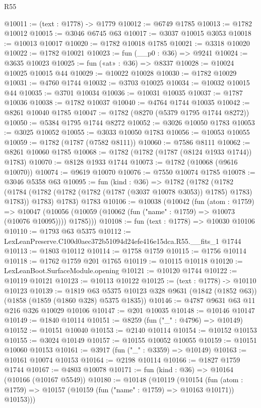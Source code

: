 \begin{lexlean}{R55}
\begin{coremodule}
@10011 := (text : @1778) -> @1779
@10012 := @6749 @1785
@10013 := @1782 @10012
@10015 := @3046 @6745 @63
@10017 := @3037 @10015 @3053
@10018 := @10013 @10017
@10020 := @1782 @10018 @1785
@10021 := @3318 @10020
@10022 := @1782 @10021
@10023 := fun (__p0 : @36) => @9241
@10024 := @3635 @10023
@10025 := fun («at» : @36) => @8337
@10028 := @10024 @10025 @10015 @44
@10029 := @10022 @10028
@10030 := @1782 @10029
@10031 := @4760 @1744
@10032 := @3703 @10025
@10034 := @10032 @10015 @44
@10035 := @3701 @10034
@10036 := @10031 @10035
@10037 := @1787 @10036
@10038 := @1782 @10037
@10040 := @4764 @1744 @10035
@10042 := @8261 @10040 @1785
@10047 := @1782 (@8270 (@5379 @1795 @1744 @8272))
@10050 := @5384 @1795 @1744 @8272
@10052 := @3026 @10050 @1783
@10053 := @3025 @10052
@10055 := @3033 @10050 @1783
@10056 := @10053 @10055
@10059 := @1782 (@1787 (@7582 @8111))
@10060 := @7586 @8111
@10062 := @8261 @10060 @1785
@10068 := @1782 (@1782 (@1787 (@8124 @1933 @1744)) @1783)
@10070 := @8128 @1933 @1744
@10073 := @1782 (@10068 (@9616 @10070))
@10074 := @9619 @10070
@10076 := @7550 @10074 @1785
@10078 := @3046 @5358 @63
@10095 := fun (kind : @36) =>
  @1782
    (@1782
      (@1782 (@1784 (@1782 (@1782 (@1782 (@1787 (@3037 @10078 @3053)) @1785) @1783) @1783)) @1783)
      @1783)
    @1783
@10106 := @10038
    (@10042
      (fun (atom : @1759) =>
      @10047 (@10056 (@10059 (@10062 (fun ("name" : @1759) => @10073 (@10076 @10095)))) @1785)))
@10108 := fun (text : @1778) => @10030 @10106
@10110 := @1793 @63 @5375
@10112 := LexLeanPreserve.C100d0aec372b51094d24efe416e15dca.R55.__fits_1 @1744
@10113 := @1803 @10112
@10114 := @1758 @1759
@10115 := @1756 @10114
@10118 := @1762 @1759 @201 @1765
@10119 := @10115 @10118
@10120 := LexLeanBoot.SurfaceModule.opening
@10121 := @10120 @1744
@10122 := @10119 @10121
@10123 := @10113 @10122
@10125 := (text : @1778) -> @10110 @10123
@10139 := @1819
    @63
    @5375
    @10123
    @328
    @9631
    (@1842 (@1852 @63))
    (@1858 (@1859 (@1860 @328) @5375 @1835))
@10146 := @4787 @9631 @63 @11 @216 @326 @10029 @10106
@10147 := @201 @10035
@10148 := @10146 @10147
@10149 := @1840 @10114
@10151 := @8259 (fun ("_" : @4796) => @10149)
@10152 := @10151 @10040
@10153 := @2140 @10114
@10154 := @10152 @10153
@10155 := @3024 @10149
@10157 := @10155 @10052 @10055
@10159 := @10151 @10060 @10153
@10161 := @3917 (fun ("_" : @3359) => @10149)
@10163 := @10161 @10074 @10153
@10164 := @2198 @10114
@10166 := @1827 @1759 @1744
@10167 := @4803 @10078
@10171 := fun (kind : @36) => @10164 (@10166 (@10167 @5549))
@10180 := @10148
    (@10119
      (@10154
        (fun (atom : @1759) => @10157 (@10159 (fun ("name" : @1759) => @10163 @10171)) @10153)))

\end{coremodule}
\end{lexlean}
